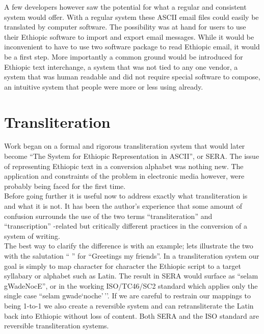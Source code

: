 A few developers however saw the potential for what a regular and consistent
system would offer.  With a regular system these ASCII email files could easily
be translated by computer software.  The possibility was at hand for users to
use their Ethiopic software to import and export email messages.  While it
would be inconvenient to have to use two software package to read Ethiopic
email, it would be a first step.  More importantly a common ground would be
introduced for Ethiopic text interchange, a system that was not tied to any
one vendor, a system that was human readable and did not require special
software to compose, an intuitive system that people were more or less using
already.\\


\section*{Transliteration}
Work began on a formal and rigorous transliteration system that would later
become ``The System for Ethiopic Representation in ASCII'', or SERA.  The
issue of representing Ethiopic text in a conversion alphabet was nothing new.
The application and constraints of the problem in electronic media however,
were probably being faced for the first time.\\

Before going further it is useful now to address exactly what transliteration
is and what it is not. It has been the author's experience that some amount of
confusion surrounds the use of the two terms ``transliteration'' and
``transcription'' -related but critically different practices in the conversion
of a system of writing.\\

The best way to clarify the difference is with an example;  lets illustrate
the two with the salutation ``{\seG}{\laG}{\mG} {\gWaG}{\deG}{\NoG}{\cEG}'' for ``Greetings my friends''.
In a transliteration system our goal is simply to map character for character
the Ethiopic script to a target syllabary or alphabet such as Latin.  The
result in SERA would surface as ``selam gWadeNocE'', or in the working
ISO/TC46/SC2 standard which applies only the single case 
``selam gwade`noche{'}\,''.  If we are careful to restrain our mappings to being
1-to-1 we also create a reversible system and can retransliterate the Latin back
into Ethiopic without loss of content.  Both SERA and the ISO standard are reversible
transliteration systems.\\

